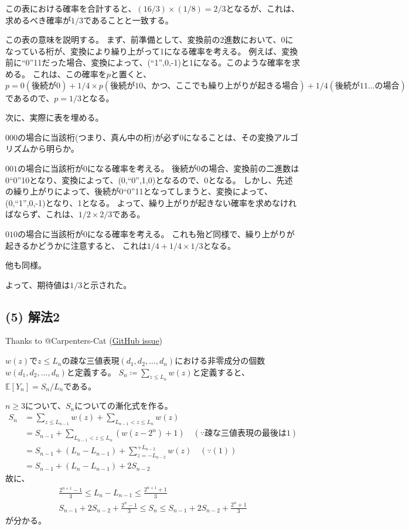 \documentclass[a4paper, 10pt, dvipdfmx]{jlreq}
\begin{document}
この表における確率を合計すると、$(16/3)\times(1/8)=2/3$となるが、これは、求めるべき確率が$1/3$であることと一致する。

この表の意味を説明する。
まず、前準備として、変換前の2進数において、0になっている桁が、変換により繰り上がって1になる確率を考える。
例えば、変換前に``0''11だった場合、変換によって、(``1'',0,-1)と1になる。このような確率を求める。
これは、この確率を$p$と置くと、$p=0(\text{後続が0})+1/4 \times p(\text{後続が10、かつ、ここでも繰り上がりが起きる場合})+1/4(\text{後続が11...}の場合)$
であるので、$p=1/3$となる。

次に、実際に表を埋める。

$000$の場合に当該桁(つまり、真ん中の桁)が必ず0になることは、その変換アルゴリズムから明らか。

$001$の場合に当該桁が0になる確率を考える。
後続が0の場合、変換前の二進数は0``0''10となり、変換によって、(0,``0'',1,0)となるので、0となる。
しかし、先述の繰り上がりによって、後続が0``0''11となってしまうと、変換によって、(0,``1'',0,-1)となり、1となる。
よって、繰り上がりが起きない確率を求めなければならず、これは、$1/2 \times 2/3$である。

$010$の場合に当該桁が0になる確率を考える。
これも殆ど同様で、繰り上がりが起きるかどうかに注意すると、
これは$1/4+1/4 \times 1/3$となる。

他も同様。

よって、期待値は$1/3$と示された。

\subsection*{(5) 解法2}

Thanks to @Carpenters-Cat (\href{https://github.com/HirokiHamaguchi/GraduateSchoolEntranceExamination/issues/9}{GitHub issue})

$w(z)$で$z\leq L_n$の疎な三値表現$(d_1, d_2, \dots, d_n)$における非零成分の個数$w(d_1, d_2, \dots, d_n)$と定義する。
$S_n \coloneqq \sum_{z \leq L_n} w(z)$と定義すると、$\mathbb{E}[Y_n] = S_n / L_n$である。

$n \geq 3$について、$S_n$についての漸化式を作る。
\begin{align*}
  S_{n} & = \sum_{z \leq L_{n-1}} w(z) + \sum_{L_{n-1} < z \leq L_{n}} w(z)                            \\
        & = S_{n-1} + \sum_{L_{n-1} < z \leq L_{n}} (w(z-2^n) + 1) \quad (\because \text{疎な三値表現の最後は1}) \\
        & = S_{n-1} + (L_n - L_{n-1}) + \sum_{z=-L_{n-2}}^{+L_{n-2}} w(z) \quad (\because (1))         \\
        & = S_{n-1} + (L_n - L_{n-1}) + 2 S_{n-2}
\end{align*}
故に、
\begin{gather*}
  \frac{2^{n+1}-1}{3} \leq L_n - L_{n-1} \leq \frac{2^{n+1}+1}{3}\\
  S_{n-1} + 2 S_{n-2} + \frac{2^n-1}{3} \leq S_n \leq S_{n-1} + 2 S_{n-2} + \frac{2^n+1}{3}
\end{gather*}
が分かる。
\end{document}
